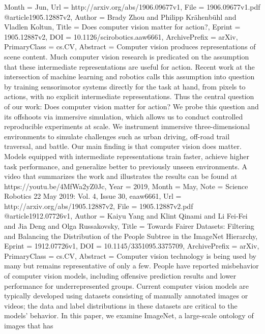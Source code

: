 {{{Month         = {Jun},
Url           = {http://arxiv.org/abs/1906.09677v1},
File          = {1906.09677v1.pdf}
}
@article{1905.12887v2,
Author        = {Brady Zhou and Philipp Krähenbühl and Vladlen Koltun},
Title         = {Does computer vision matter for action?},
Eprint        = {1905.12887v2},
DOI           = {10.1126/scirobotics.aaw6661},
ArchivePrefix = {arXiv},
PrimaryClass  = {cs.CV},
Abstract      = {Computer vision produces representations of scene content. Much computer
vision research is predicated on the assumption that these intermediate
representations are useful for action. Recent work at the intersection of
machine learning and robotics calls this assumption into question by training
sensorimotor systems directly for the task at hand, from pixels to actions,
with no explicit intermediate representations. Thus the central question of our
work: Does computer vision matter for action? We probe this question and its
offshoots via immersive simulation, which allows us to conduct controlled
reproducible experiments at scale. We instrument immersive three-dimensional
environments to simulate challenges such as urban driving, off-road trail
traversal, and battle. Our main finding is that computer vision does matter.
Models equipped with intermediate representations train faster, achieve higher
task performance, and generalize better to previously unseen environments. A
video that summarizes the work and illustrates the results can be found at
https://youtu.be/4MfWa2yZ0Jc},
Year          = {2019},
Month         = {May},
Note          = {Science Robotics 22 May 2019: Vol. 4, Issue 30, eaaw6661},
Url           = {http://arxiv.org/abs/1905.12887v2},
File          = {1905.12887v2.pdf}
}
@article{1912.07726v1,
Author        = {Kaiyu Yang and Klint Qinami and Li Fei-Fei and Jia Deng and Olga Russakovsky},
Title         = {Towards Fairer Datasets: Filtering and Balancing the Distribution of the
  People Subtree in the ImageNet Hierarchy},
Eprint        = {1912.07726v1},
DOI           = {10.1145/3351095.3375709},
ArchivePrefix = {arXiv},
PrimaryClass  = {cs.CV},
Abstract      = {Computer vision technology is being used by many but remains representative
of only a few. People have reported misbehavior of computer vision models,
including offensive prediction results and lower performance for
underrepresented groups. Current computer vision models are typically developed
using datasets consisting of manually annotated images or videos; the data and
label distributions in these datasets are critical to the models' behavior. In
this paper, we examine ImageNet, a large-scale ontology of images that has
}}}}
